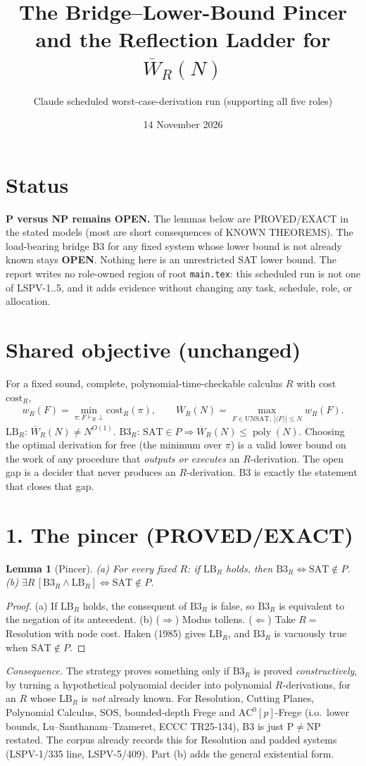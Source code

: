 \documentclass[11pt]{article}
\title{The Bridge--Lower-Bound Pincer and the Reflection Ladder for $\overline W_R(N)$}
\author{Claude scheduled worst-case-derivation run (supporting all five roles)}
\date{14 November 2026}
\newtheorem{lemma}{Lemma}
\newcommand{\SAT}{\mathrm{SAT}}
\newcommand{\poly}{\operatorname{poly}}
\begin{document}
\maketitle

\section*{Status}
\textbf{P versus NP remains OPEN.} The lemmas below are PROVED/EXACT in the stated models
(most are short consequences of KNOWN THEOREMS). The load-bearing bridge B3 for any fixed
system whose lower bound is not already known stays \textbf{OPEN}. Nothing here is an
unrestricted SAT lower bound. The report writes no role-owned region of root \texttt{main.tex}:
this scheduled run is not one of LSPV-1..5, and it adds evidence without changing any task,
schedule, role, or allocation.

\section*{Shared objective (unchanged)}
For a fixed sound, complete, polynomial-time-checkable calculus $R$ with cost $\mathrm{cost}_R$,
\[
w_R(F)=\min_{\pi:F\vdash_R\bot}\mathrm{cost}_R(\pi),\qquad
\overline W_R(N)=\max_{F\in\mathrm{UNSAT},\,|\langle F\rangle|\le N} w_R(F).
\]
$\mathrm{LB}_R$: $\overline W_R(N)\ne N^{O(1)}$. \quad $\mathrm{B3}_R$: $\SAT\in P\Rightarrow\overline W_R(N)\le\poly(N)$.
Choosing the optimal derivation for free (the minimum over $\pi$) is a valid lower bound on the work of any
procedure that \emph{outputs or executes} an $R$-derivation. The open gap is a decider that never
produces an $R$-derivation. B3 is exactly the statement that closes that gap.

\section*{1. The pincer (PROVED/EXACT)}
\begin{lemma}[Pincer]\label{pincer}
(a) For every fixed $R$: if $\mathrm{LB}_R$ holds, then $\mathrm{B3}_R\iff\SAT\notin P$.
(b) $\exists R\,[\mathrm{B3}_R\wedge \mathrm{LB}_R]\iff \SAT\notin P$.
\end{lemma}
\begin{proof}
(a) If $\mathrm{LB}_R$ holds, the consequent of $\mathrm{B3}_R$ is false, so $\mathrm{B3}_R$ is equivalent to the negation of its antecedent.
(b) ($\Rightarrow$) Modus tollens. ($\Leftarrow$) Take $R=$ Resolution with node cost. Haken (1985) gives $\mathrm{LB}_R$, and $\mathrm{B3}_R$ is vacuously true when $\SAT\notin P$.
\end{proof}
\noindent\emph{Consequence.} The strategy proves something only if $\mathrm{B3}_R$ is proved
\emph{constructively}, by turning a hypothetical polynomial decider into polynomial $R$-derivations, for an $R$ whose
$\mathrm{LB}_R$ is \emph{not} already known. For Resolution, Cutting Planes, Polynomial Calculus,
SOS, bounded-depth Frege and $\mathrm{AC}^0[p]$-Frege (i.o.\ lower bounds, Lu--Santhanam--Tzameret, ECCC TR25-134), B3 is just
P$\ne$NP restated. The corpus already records this for Resolution and padded systems (LSPV-1/335 line, LSPV-5/409). Part (b) adds the general existential form.
\end{document}
